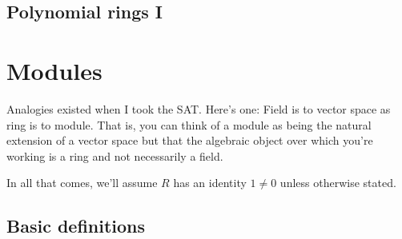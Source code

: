 \documentclass[12pt]{article}
\begin{document}
\subsection{Polynomial rings I}
\label{sec:polynomial-rings-i}

\section{Modules}
\label{sec:modules}

Analogies existed when I took the SAT. Here's one: Field is to vector
space as ring is to module. That is, you can think of a module as
being the natural extension of a vector space but that the algebraic
object over which you're working is a ring and not necessarily a
field.

In all that comes, we'll assume $R$ has an identity $1\neq 0$ unless
otherwise stated. 

\subsection{Basic definitions}
\label{sec:basic-definitions}
\end{document}

